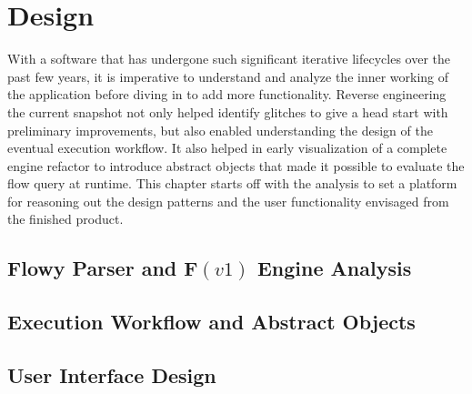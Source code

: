 \chapter{Design}\label{ch:design}

With a software that has undergone such significant iterative lifecycles over
the past few years, it is imperative to understand and analyze the inner
working of the application before diving in to add more functionality. Reverse
engineering the current snapshot not only helped identify glitches to give a
head start with preliminary improvements, but also enabled understanding the
design of the eventual execution workflow. It also helped in early
visualization of a complete engine refactor to introduce abstract objects that
made it possible to evaluate the flow query at runtime. This chapter starts off
with the analysis to set a platform for reasoning out the design patterns and
the user functionality envisaged from the finished product.

\section{Flowy Parser and F$(v1)$ Engine Analysis}\label{sec:analysis}


\section{Execution Workflow and Abstract Objects}\label{sec:adt-workflow}


\section{User Interface Design}\label{sec:engine-interface}


